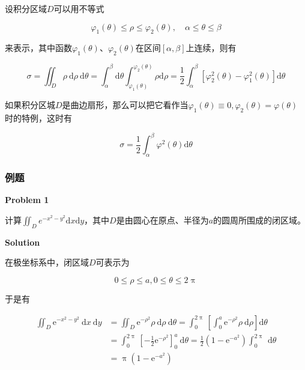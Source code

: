 \documentclass[12pt, a4paper]{article}
\numberwithin{equation}{section}
\newcommand{\rmd}{\mathrm{d}}
\begin{document}
    设积分区域$D$可以用不等式

    $$
        \varphi_1(\theta) \leq \rho \leq \varphi_2(\theta), \quad \alpha \leq \theta \leq \beta
    $$

    来表示，其中函数$\varphi_1(\theta)$、$\varphi_2(\theta)$在区间$[\alpha, \beta]$上连续，则有

    $$
        \sigma=\iint_D \rho \mathrm{~d} \rho \mathrm{~d} \theta=
        \int_\alpha^\beta \mathrm{d} \theta \int_{\varphi_1(\theta)}^{\varphi_2(\theta)} \rho \mathrm{d} \rho
        =\frac{1}{2} \int_\alpha^\beta\left[\varphi_2^2(\theta)-\varphi_1^2(\theta)\right] \mathrm{d} \theta
    $$

    如果积分区城$D$是曲边扇形，那么可以把它看作当$\varphi_1(\theta) \equiv 0, \varphi_2(\theta)=\varphi(\theta)$
    时的特例，这时有

    $$
        \sigma=\frac{1}{2} \int_\alpha^\beta \varphi^2(\theta) \mathrm{d} \theta
    $$

\subsubsection{例题}

    \textbf{Problem 1}
    \vspace{1em}

    计算${\displaystyle \iint_D e^{-x^2-y^2} \rmd x \rmd y}$，其中$D$是由圆心在原点、半径为\(a \)的圆周所围成的闭区域。
    \vspace{1em}

    \textbf{Solution}
    \vspace{1em}

    在极坐标系中，闭区域\(D \)可表示为

    \[
        0 \leq \rho \leq a, 0 \leq \theta \leq 2 \uppi
    \]

    于是有

    $$
        \begin{aligned}
            \iint_D \mathrm{e}^{-x^2-y^2} \mathrm{~d} x \mathrm{~d} y & =\iint_D \mathrm{e}^{-\rho^2} \rho \mathrm{~d} \rho \mathrm{~d} \theta=\int_0^{2 \uppi}\left[\int_0^a \mathrm{e}^{-\rho^2} \rho \mathrm{~d} \rho\right] \mathrm{d} \theta \\
            & =\int_0^{2 \uppi}\left[-\frac{1}{2} \mathrm{e}^{-\rho^2}\right]_0^a \mathrm{~d} \theta=\frac{1}{2}\left(1-\mathrm{e}^{-a^2}\right) \int_0^{2 \uppi} \mathrm{~d} \theta \\
            & =\uppi\left(1-\mathrm{e}^{-a^2}\right)
        \end{aligned}
    $$
    \vspace{1em}
\end{document}
